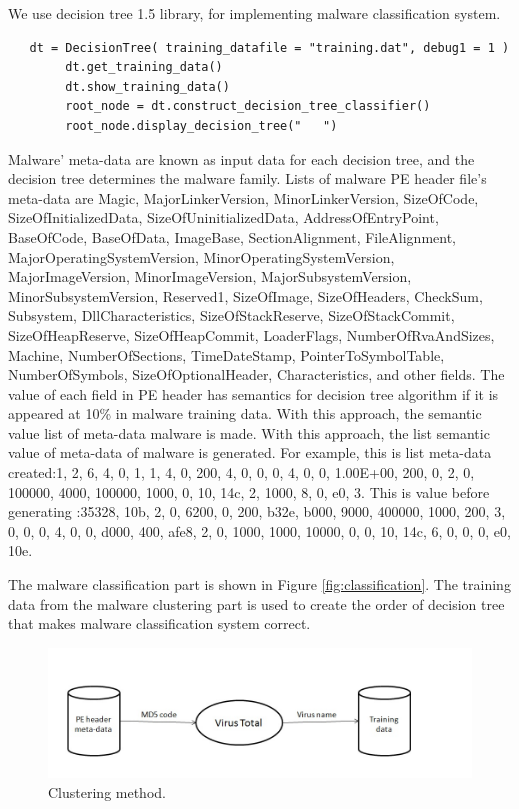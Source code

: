 We use decision tree 1.5 library, for implementing malware classification system. 
\begin{verbatim}
   dt = DecisionTree( training_datafile = "training.dat", debug1 = 1 )
        dt.get_training_data()
        dt.show_training_data()
        root_node = dt.construct_decision_tree_classifier()
        root_node.display_decision_tree("   ")
\end{verbatim}
 
Malware' meta-data are known as input data for each decision tree, and the decision tree determines the malware family. Lists of malware PE header file's meta-data are Magic, MajorLinkerVersion, MinorLinkerVersion, SizeOfCode, SizeOfInitializedData, SizeOfUninitializedData, AddressOfEntryPoint, BaseOfCode, BaseOfData, ImageBase, SectionAlignment, FileAlignment, MajorOperatingSystemVersion, MinorOperatingSystemVersion, MajorImageVersion, MinorImageVersion, MajorSubsystemVersion, MinorSubsystemVersion, Reserved1, SizeOfImage, SizeOfHeaders, CheckSum, Subsystem, DllCharacteristics, SizeOfStackReserve, SizeOfStackCommit, SizeOfHeapReserve, SizeOfHeapCommit, LoaderFlags, NumberOfRvaAndSizes, Machine, NumberOfSections, TimeDateStamp, PointerToSymbolTable, NumberOfSymbols, SizeOfOptionalHeader, Characteristics, and other fields. The value of each field in PE header has semantics for decision tree algorithm if it is appeared at 10\% in malware training data. With this approach, the semantic value list of meta-data malware is made. With this approach, the list semantic value of meta-data of malware is generated. For example, this is list meta-data created:1, 2, 6, 4, 0, 1, 1, 4, 0, 200, 4, 0, 0, 0, 4, 0, 0, 1.00E+00, 200, 0, 2, 0, 100000, 4000, 100000, 1000, 0, 10, 14c, 2, 1000, 8, 0, e0, 3. This is value before generating :35328, 10b, 2, 0, 6200, 0, 200, b32e, b000, 9000, 400000, 1000, 200, 3, 0, 0, 0, 4, 0, 0, d000, 400, afe8, 2, 0, 1000, 1000, 10000, 0, 0, 10, 14c, 6, 0, 0, 0, e0, 10e.
 
The malware classification part is shown in Figure \ref{fig:classification}. The training data from the malware clustering part is used to create the order of decision tree that makes malware classification system correct.
\begin{figure}[h!]
\centering
\includegraphics[width=1\textwidth]{graph/clustering.jpg}
\caption{Clustering method.}
\label{fig:clustering}
\end{figure}